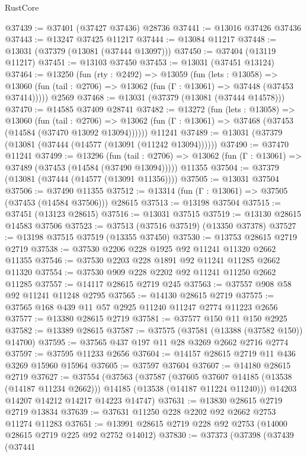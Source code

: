 \begin{lexlean}{RustCore}
\begin{coremodule}
@37439 := @37401 (@37427 @37436) @28736
@37441 := @13016 @37426 @37436
@37443 := @13247 @37425 @11217
@37444 := @13084 @11217
@37448 := @13031 (@37379 (@13081 (@37444 @13097)))
@37450 := @37404 (@13119 @11217)
@37451 := @13103 @37450
@37453 := @13031 (@37451 @13124)
@37464 := @13250
    (fun (rty : @2492) =>
    @13059
      (fun (lets : @13058) =>
      @13060 (fun (tail : @2706) => @13062 (fun (Γ : @13061) => @37448 (@37453 @37414)))))
    @2569
@37468 := @13031 (@37379 (@13081 (@37444 @14578)))
@37470 := @14585 @37409 @28741
@37482 := @13272
    (fun (lets : @13058) =>
    @13060
      (fun (tail : @2706) =>
      @13062 (fun (Γ : @13061) => @37468 (@37453 (@14584 (@37470 @13092 @13094))))))
    @11241
@37489 := @13031 (@37379 (@13081 (@37444 (@14577 (@13091 (@11242 @13094))))))
@37490 := @37470 @11241
@37499 := @13296
    (fun (tail : @2706) => @13062 (fun (Γ : @13061) => @37489 (@37453 (@14584 (@37490 @13094)))))
    @11355
@37504 := @37379 (@13081 (@37444 (@14577 (@13091 @11356))))
@37505 := @13031 @37504
@37506 := @37490 @11355
@37512 := @13314 (fun (Γ : @13061) => @37505 (@37453 (@14584 @37506))) @28615
@37513 := @13198 @37504
@37515 := @37451 (@13123 @28615)
@37516 := @13031 @37515
@37519 := @13130 @28615 @14583 @37506
@37523 := @37513 (@37516 @37519) (@13350 @37378)
@37527 := @13198 @37515 @37519 (@13355 @37450)
@37530 := @13753 @28615 @2719 @2719
@37538 := @37530 @2206 @228 @1925 @92 @11241 @11320 @2662 @11355
@37546 := @37530 @2203 @228 @1891 @92 @11241 @11285 @2662 @11320
@37554 := @37530 @909 @228 @2202 @92 @11241 @11250 @2662 @11285
@37557 := @14117 @28615 @2719 @245
@37563 := @37557 @908 @58 @92 @11241 @11248 @2795
@37565 := @14130 @28615 @2719
@37575 := @37565 @168 @439 @11 @57 @2925 @11240 @11247 @2774 @11223 @2656
@37577 := @13380 @28615 @2719
@37581 := @37577 @150 @11 @150 @2925
@37582 := @13389 @28615
@37587 := @37575 (@37581 (@13388 (@37582 @150)) @14700)
@37595 := @37565 @437 @197 @11 @28 @3269 @2662 @2716 @2774
@37597 := @37595 @11233 @2656
@37604 := @14157 @28615 @2719 @11 @436 @3269 @15960 @15964
@37605 := @37597 @37604
@37607 := @14180 @28615 @2719
@37627 := @37554
    (@37563
      (@37587
        (@37605 @37607 @14185 (@13538 (@14187 @11234 @2662)))
        @14185
        (@13538 (@14187 @11224 @11240)))
      @14203
      @14207
      @14212
      @14217
      @14223
      @14747)
@37631 := @13830 @28615 @2719 @2719 @13834
@37639 := @37631 @11250 @228 @2202 @92 @2662 @2753 @11274 @11283
@37651 := @13991 @28615 @2719 @228 @92 @2753 (@14000 @28615 @2719 @225 @92 @2752 @14012)
@37830 := @37373
    (@37398
      (@37439
        (@37441

\end{coremodule}
\end{lexlean}

